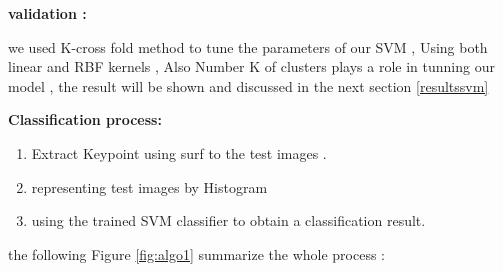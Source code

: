 \textbf{validation :}

we used K-cross fold method to tune the parameters of our SVM  , Using both linear and RBF kernels , Also Number K of clusters plays a role in tunning our model , the result will be shown and discussed in the next section \ref{resultssvm} 



\textbf{Classiﬁcation process: }
\begin{enumerate}
    \item Extract Keypoint using surf to the test images .
    \item  representing test images by Histogram
    \item using the trained SVM classiﬁer to obtain a classiﬁcation
result.
    
\end{enumerate}


the following Figure \ref{fig:algo1}  summarize the whole  process :

